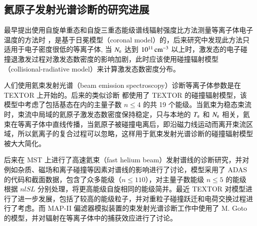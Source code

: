 \subsection{氦原子发射光谱诊断的研究进展}
\label{sec:chap01:research-history}

最早提出使用自旋单重态和自旋三重态能级谱线辐射强度比方法测量等离子体电子温度的方法时
\cite{Sovie1964-He-coronal,Vries1966-He-coronal}，是基于日冕模型（coronal model）的，后来研究中发现此方法只适用于电子密度很低的等离子体, 当 $N_{\rm e}$ 达到 $10^{11}\,{\rm cm}^{-3}$ 以上时，激发态的电子碰撞退激发过程对激发态数密度的影响加剧，此时应该使用碰撞辐射模型（collisional-radiative model）来计算激发态数密度分布\cite{Newe1966-He-CRRecommend}。

人们使用氦束发射光谱（beam emission spectroscopy）诊断等离子体参数是在 TEXTOR\cite{Schweer1992174} 上开始的。后来的类似诊断\cite{Davies1997-HeBES-JET,Field-HeBES-COMPASSD,Hidalgo-HeBES-TJII}
都使用了 TEXTOR 的碰撞辐射模型，该模型中考虑了包括基态在内的主量子数 $n\le 4$ 的共 19 个能级。当氦束为稳态束流时，束流中局域的氦原子激发态数密度保持稳定，只与本地的 $T_{\rm e}$ 和 $N_{\rm e}$ 相关，氦束在等离子体中直线传播，当氦原子被碰撞电离后，即沿磁力线运动而离开束流区域，所以氦离子的复合过程可以忽略，这样用于氦束发射光谱诊断的碰撞辐射模型被大大简化。

后来在 MST 上进行了高速氦束（fast helium beam）发射谱线的诊断研究\cite{Ahn2007-He-BES}，并对例如杂质、磁场和离子碰撞等因素对谱线的影响进行了讨论，模型采用了 ADAS\cite{ADAS} 的代码和截面数据，包含了众多能级（$n\le 110$），对主量子数能级 $n\le5$ 的能级根据 $nlSL$ 分别处理，将更高能级自旋相同的能级简并。最近 TEXTOR 对模型进行了进一步发展\cite{Schmitz2008}，包括了较高的能级粒子，并对重粒子碰撞跃迁和电荷交换过程进行了考虑。而 MAP-II 偏滤器模拟装置\cite{Iida2010-HeBES-MAPII}的束发射光谱诊断工作中使用了 M. Goto 的模型\cite{Goto2003-HeCRM}，并对辐射在等离子体中的捕获效应进行了讨论。

